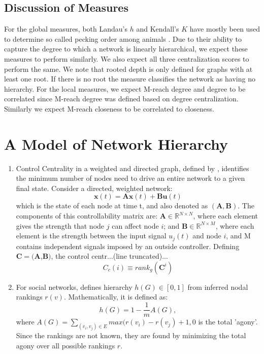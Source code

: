 \documentclass[3p,times]{elsarticle}
\begin{document}
\subsection{Discussion of Measures}
For the global measures, both Landau's $h$ and Kendall's $K$ have mostly been used to determine so called pecking order among animals \cite{animals}. Due to their ability to capture the degree to which a network is linearly hierarchical, we expect these measures to perform similarly. We also expect all three centralization scores to perform the same. We note that rooted depth is only defined for graphs with at least one root. If there is no root the measure classifies the network as having no hierarchy. For the local measures, we expect M-reach degree and degree to be correlated since M-reach degree was defined based on degree centralization. Similarly we expect M-reach closeness to be correlated to closeness.  

















\section{A Model of Network Hierarchy}

\begin{enumerate}
	\item Control Centrality in a weighted and directed graph, defined by \cite{Liu12}, identifies the minimum number of nodes need to drive an entire network to a given final state. Consider a directed, weighted network:
	$$
	\bm{x}(t) = \bm{Ax}(t) + \bm{Bu}(t)
	$$
	which is the state of each node at time t, and also denoted as \begin{math}(\bm{A},\bm{B})\end{math}. The components of this controllability matrix are: $\bm{A}\in \mathbb{R}^{N\times N}$, where each element gives the strength that node $j$ can affect node $i$; and $\bm{B}\in\mathbb{R}^{N\times M}$, where each element is the strength between the input signal $u_{j}(t)$ and node $i$, and M contains independent signals imposed by an outside controller. Defining $\bm{C} = (\bm{A}$,$\bm{B})$, the control centr...(line truncated)...
	$$
	C_{c}(i) \equiv rank_{g}(\bm{C}^{i})
	$$
	
	\item For social networks, \cite{online} defines hierarchy $h(G)\in[0,1]$ from inferred nodal rankings $r(v)$. Mathematically, it is defined as:
	$$
	h(G)=1-\frac{1}{m}A(G),
	$$ 
	where $A(G)=\sum_{(v_i,v_j)\in E} {max(r(v_i)-r(v_j)+1,0}$ is the total 'agony'. Since the rankings are not known, they are found by minimizing the total agony over all possible rankings $r$.
	
	\end{enumerate}
	
\end{document}

